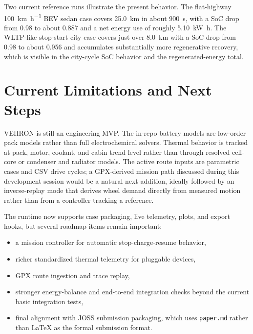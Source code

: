 \documentclass[11pt,a4paper]{article}
\begin{document}
Two current reference runs illustrate the present behavior. The flat-highway \SI{100}{\kilo\meter\per\hour} BEV sedan case covers \SI{25.0}{\kilo\meter} in about \SI{900}{\second}, with a SoC drop from 0.98 to about 0.887 and a net energy use of roughly \SI{5.10}{\kilo\watt\hour}. The WLTP-like stop-start city case covers just over \SI{8.0}{\kilo\meter} with a SoC drop from 0.98 to about 0.956 and accumulates substantially more regenerative recovery, which is visible in the city-cycle SoC behavior and the regenerated-energy total.

\begin{table}[H]
\centering
\caption{Representative current case summaries generated by VEHRON case packages.}
\label{tab:cases}
\end{table}

\section{Current Limitations and Next Steps}
VEHRON is still an engineering MVP. The in-repo battery models are low-order pack models rather than full electrochemical solvers. Thermal behavior is tracked at pack, motor, coolant, and cabin trend level rather than through resolved cell-core or condenser and radiator models. The active route inputs are parametric cases and CSV drive cycles; a GPX-derived mission path discussed during this development session would be a natural next addition, ideally followed by an inverse-replay mode that derives wheel demand directly from measured motion rather than from a controller tracking a reference.

The runtime now supports case packaging, live telemetry, plots, and export hooks, but several roadmap items remain important:
\begin{itemize}
\item a mission controller for automatic stop-charge-resume behavior,
\item richer standardized thermal telemetry for pluggable devices,
\item GPX route ingestion and trace replay,
\item stronger energy-balance and end-to-end integration checks beyond the current basic integration tests,
\item final alignment with JOSS submission packaging, which uses \texttt{paper.md} rather than LaTeX as the formal submission format.
\end{itemize}
\end{document}
